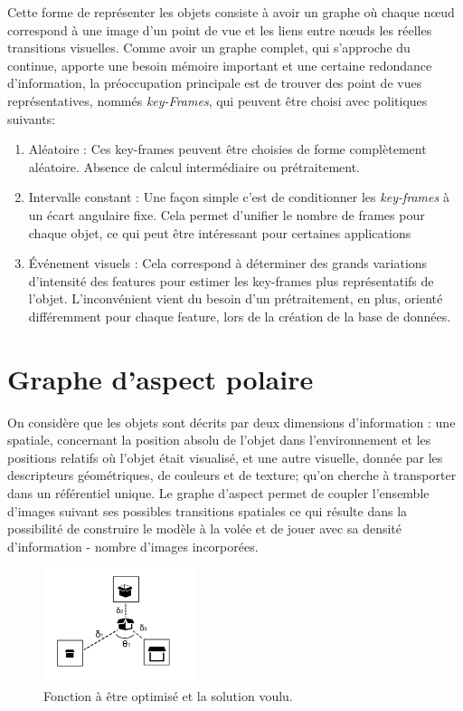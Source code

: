 Cette forme de représenter les objets consiste à avoir un graphe où
chaque nœud correspond à une image d'un point de vue et les liens
entre nœuds les réelles transitions visuelles. Comme avoir un graphe
complet, qui s'approche du continue, apporte une besoin mémoire
important et une certaine redondance d'information, la préoccupation
principale est de trouver des point de vues représentatives, nommés
\textit{key-Frames}, qui peuvent être choisi avec politiques suivants:
\begin{enumerate}
\item Aléatoire : Ces key-frames peuvent être choisies de forme
  complètement aléatoire. Absence de calcul intermédiaire ou
  prétraitement.

\item Intervalle constant : Une façon simple c'est de conditionner les
  \textit{key-frames} à un écart angulaire fixe. Cela permet d'unifier
  le nombre de frames pour chaque objet, ce qui peut être intéressant
  pour certaines applications

\item Événement visuels : Cela correspond à déterminer des grands
  variations d'intensité des features pour estimer les key-frames plus
  représentatifs de l'objet. L'inconvénient vient du besoin d'un
  prétraitement, en plus, orienté différemment pour chaque feature,
  lors de la création de la base de données.

\end{enumerate}

\section {Graphe d'aspect polaire}

On considère que les objets sont décrits par deux dimensions
d'information : une spatiale, concernant la position absolu de l'objet
dans l'environnement et les positions relatifs où l'objet était
visualisé, et une autre visuelle, donnée par les descripteurs
géométriques, de couleurs et de texture; qu'on cherche à transporter
dans un référentiel unique. Le graphe d'aspect permet de coupler
l'ensemble d'images suivant ses possibles transitions spatiales ce qui
résulte dans la possibilité de construire le modèle à la volée et de
jouer avec sa densité d'information - nombre d'images incorporées.

\begin{figure}[H]
  \centering
  \includegraphics[width=0.4\textwidth]{object_model.png}
  \caption{Fonction \`{a} \^{e}tre optimis\'{e} et la solution voulu.}
\end{figure}

